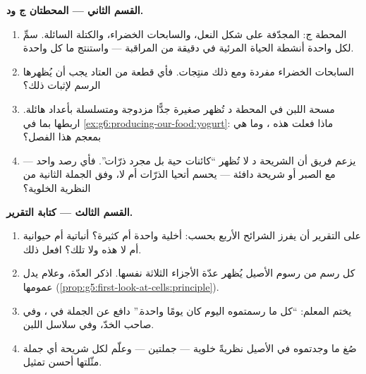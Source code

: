 \begin{problem}
\medskip\noindent\textbf{القسم الثاني --- المحطتان ج ود.}
\begin{enumerate}[resume]
  \item المحطة ج: المجدّفة على شكل النعل، والسابحات الخضراء،
        والكتلة السائلة. سمِّ لكل واحدة أنشطة الحياة المرئية في
        دقيقة من المراقبة --- واستنتج ما كل واحدة.
  \item السابحات الخضراء  مفردة ومع ذلك منتِجات. فأي قطعة من
        العتاد يجب أن يُظهرها الرسم لإثبات ذلك؟
  \item مسحة اللبن في المحطة د تُظهر  صغيرة جدًّا مزدوجة
        ومتسلسلة بأعداد هائلة. اربطها بما في
        \cref{ex:g6:producing-our-food:yogurt}: ماذا فعلت هذه
         ، وما هي بمعجم هذا الفصل؟
  \item يزعم فريق أن الشريحة د لا تُظهر ``كائنات حية بل مجرد
        ذرّات''. فأي رصد واحد --- مع الصبر أو شريحة دافئة ---
        يحسم أتحيا الذرّات أم لا، وفق الجملة الثانية من النظرية
        الخلوية؟
\end{enumerate}

\medskip\noindent\textbf{القسم الثالث --- كتابة التقرير.}
\begin{enumerate}[resume]
  \item على التقرير أن يفرز الشرائح الأربع بحسب: أخلية واحدة أم
        كثيرة؟ أنباتية أم حيوانية أم لا هذه ولا تلك؟ افعل ذلك.
  \item كل رسم من رسوم الأصيل يُظهر عدّة الأجزاء الثلاثة نفسها.
        اذكر العدّة، وعلام يدل عمومها
        (\cref{prop:g5:first-look-at-cells:principle}).
  \item يختم المعلم: ``كل ما رسمتموه اليوم كان يومًا 
        واحدة.'' دافع عن الجملة في ، وفي صاحب  الخدّ،
        وفي سلاسل اللبن.
  \item صُغ ما وجدتموه في الأصيل نظريةً خلوية --- جملتين ---
        وعلّم لكل شريحة أي جملة مثّلتها أحسن تمثيل.
\end{enumerate}
\end{problem}
